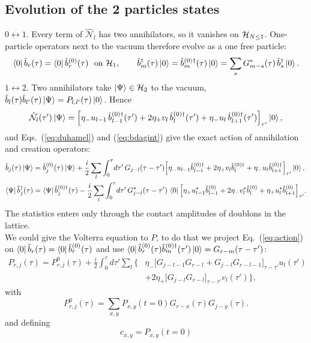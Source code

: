 \documentclass[a4paper, amsfonts, amssymb, amsmath, reprint, showkeys, nofootinbib ,twoside]{revtex4-2}
\begin{document}
\subsection{Evolution of the 2 particles states} 
$0\leftrightarrow1$. Every term of $\hat{\mathcal N}_l$ has two annihilators, so it vanishes on $\mathcal H_{N\le1}$. One-particle operators next to the vacuum therefore evolve as a one free particle:
\begin{equation}\label{eq:rung01}
\bra0\hat b_{r}(\tau)=\bra0\hat b^{(0)}_r(\tau)\ \ \text{on }\mathcal H_{1},\qquad
\hat b^\dagger_{m}(\tau)\ket0=\hat b^{(0)\dagger}_m(\tau)\ket0=\sum_sG^*_{m-s}(\tau)\,\hat b^\dagger_{s}\ket0 .
\end{equation}
$1\leftrightarrow2$. Two annihilators take $\ket\Psi\in\mathcal H_{2}$ to the vacuum, $\hat b_{l}(\tau)\hat b_{l'}(\tau)\ket\Psi=P_{l,l'}(\tau)\ket0$. Hence
\begin{equation}
\hat{\mathcal N}_l(\tau')\ket\Psi=\Big[\eta_-u_{l-1}\,\hat b^{(0)\dagger}_{l-1}(\tau')+2\eta_+v_l\,\hat b^{(0)\dagger}_l(\tau')+\eta_-u_l\,\hat b^{(0)\dagger}_{l+1}(\tau')\Big]_{\tau'}\ket0,
\end{equation}
and Eqs.~(\ref{eq:duhamel}) and (\ref{eq:bdagint}) give the exact action of annihilation and creation operators:
\begin{equation}\label{eq:action}
\begin{split}
\hat b_{j}(\tau)\ket\Psi&=\hat b^{(0)}_j(\tau)\ket\Psi+\frac i2\sum_l\int_0^\tau\!d\tau'\,G_{j-l}(\tau-\tau')\Big[\eta_-u_{l-1}\hat b^{(0)\dagger}_{l-1}+2\eta_+v_l\hat b^{(0)\dagger}_l+\eta_-u_l\hat b^{(0)\dagger}_{l+1}\Big]_{\tau'}\ket0,\\
\bra\Psi\hat b^\dagger_{j}(\tau)&=\bra\Psi\hat b^{(0)\dagger}_j(\tau)-\frac i2\sum_l\int_0^\tau\!d\tau'\,G^*_{j-l}(\tau-\tau')\,\bra0\Big[\eta_+u^*_{l-1}\hat b^{(0)}_{l-1}+2\eta_-v^*_l\hat b^{(0)}_l+\eta_+u^*_l\hat b^{(0)}_{l+1}\Big]_{\tau'} .
\end{split}
\end{equation}
The statistics enters only through the contact amplitudes of doublons in the lattice.\\
We could give the Volterra equation to $P$, to do that we project Eq.~(\ref{eq:action}) on $\bra0\hat b_{r}(\tau)=\bra0\hat b^{(0)}_r(\tau)$ and use $\bra0\hat b^{(0)}_r(\tau)\hat b^{(0)\dagger}_m(\tau')\ket0=G_{r-m}(\tau-\tau')$:
\begin{equation}\label{eq:volP}
\begin{split}
P_{r,j}(\tau)=P^{0}_{r,j}(\tau)+\frac i2\int_0^\tau\!d\tau'\sum_l\Big\{&\eta_-\big[G_{j-l-1}G_{r-l}+G_{j-l}G_{r-l-1}\big]_{\tau-\tau'}u_l(\tau')\\
&+2\eta_+\big[G_{j-l}G_{r-l}\big]_{\tau-\tau'}v_l(\tau')\Big\},
\end{split}
\end{equation}
with 
\begin{equation} 
P^0_{r,j}(\tau)=\sum_{x,y}P_{x,y}(t=0)G_{r-x}(\tau)G_{j-y}(\tau).
\end{equation} 
and defining 
\begin{equation} 
c_{x,y} = P_{x,y}(t=0)
\end{equation}
\end{document}
